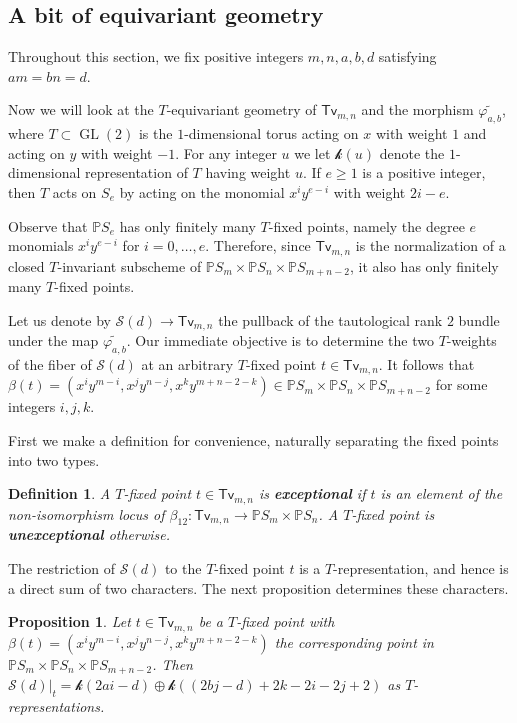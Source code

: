 \documentclass[12pt]{article}
\theoremstyle{plain}
\newtheorem{proposition}[theorem]{Proposition}
\newtheorem{definition}[theorem]{Definition}
\theoremstyle{remark}
\renewcommand{\P}{\mathbb{P}}
\newcommand{\GL}{\operatorname{GL}}
\renewcommand{\S}{\mathscr{S}}
\newcommand{\transvectant}{\mathsf{Tv}}
\renewcommand{\k}{\mathscr{k}}
\begin{document}
\subsection{A bit of equivariant geometry}

Throughout this section, we fix positive integers $m,n,a,b,d$ satisfying $am = bn = d$.

Now we will look at the $T$-equivariant geometry of $\transvectant_{m,n}$ and the morphism $\widetilde{\varphi_{a,b}}$, where $T \subset \GL(2)$ is the $1$-dimensional torus acting on $x$ with weight $1$ and acting on $y$ with weight $-1$. For any integer $u$ we let $\k(u)$ denote the $1$-dimensional representation of $T$ having weight $u$. If $e \geq 1$ is a positive integer, then $T$ acts on $S_e$ by acting on the monomial $x^iy^{e-i}$ with weight $2i-e$.

Observe that $\P S_{e}$ has only finitely many $T$-fixed points, namely the degree $e$ monomials $x^iy^{e-i}$ for $i = 0, \dots, e$. Therefore, since $\transvectant_{m,n}$ is the normalization of a closed $T$-invariant subscheme of $\P S_{m} \times \P S_{n} \times \P S_{m+n-2}$, it also has only finitely many $T$-fixed points.

Let us denote by $\S(d) \to \transvectant_{m,n}$ the pullback of the tautological rank $2$ bundle under the map $\widetilde{\varphi_{a,b}}$.  Our immediate objective is to determine the two $T$-weights of the fiber of $\S(d)$ at an arbitrary $T$-fixed point $t \in \transvectant_{m,n}$.  It follows that $\beta(t) = (x^{i}y^{m-i}, x^{j}y^{n-j}, x^{k}y^{m+n-2-k}) \in \P S_{m} \times \P S_{n} \times \P S_{m+n-2}$ for some integers $i,j,k$.

First we make a definition for convenience, naturally separating the fixed points into two types.

\begin{definition}
    \label{definition:exceptionalfixedpoint} A $T$-fixed point $t \in \transvectant_{m,n}$ is \textbf{exceptional} if $t$ is an element of the non-isomorphism locus of $\beta_{12}: \transvectant_{m,n} \to \P S_{m} \times \P S_{n}$.  A $T$-fixed point is \textbf{unexceptional} otherwise.
\end{definition}

The restriction of $\S(d)$ to the $T$-fixed point $t$ is a $T$-representation, and hence is a direct sum of two characters.  The next proposition determines these characters.

\begin{proposition}
\label{proposition:weightsofS}
Let $t \in \transvectant_{m,n}$ be a $T$-fixed point with $\beta(t) = (x^{i}y^{m-i}, x^{j}y^{n-j}, x^{k}y^{m+n-2-k})$ the corresponding point in $\P S_{m} \times \P S_{n} \times \P S_{m+n-2}$.  Then
$\S(d)|_{t} = \k(2ai - d) \oplus \k((2bj - d) + 2k-2i-2j+2)$ as $T$-representations.
\end{proposition}
\end{document}
